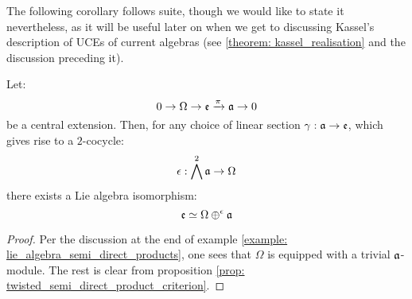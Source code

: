         The following corollary follows suite, though we would like to state it nevertheless, as it will be useful later on when we get to discussing Kassel's description of UCEs of current algebras (see \ref{theorem: kassel_realisation} and the discussion preceding it).
        \begin{corollary} \label{coro: lie_brackets_on_central_extensions}
            Let:
                $$0 \to \Omega \to \mathfrak{e} \xrightarrow[]{\pi} \mathfrak{a} \to 0$$
            be a central extension. Then, for any choice of linear section $\gamma: \mathfrak{a} \to \mathfrak{e}$, which gives rise to a $2$-cocycle:
                $$\epsilon: \bigwedge^2 \mathfrak{a} \to \Omega$$
            there exists a Lie algebra isomorphism:
                $$\mathfrak{e} \simeq \Omega \oplus^{\epsilon} \mathfrak{a}$$
        \end{corollary}
            \begin{proof}
                Per the discussion at the end of example \ref{example: lie_algebra_semi_direct_products}, one sees that $\Omega$ is equipped with a trivial $\mathfrak{a}$-module. The rest is clear from proposition \ref{prop: twisted_semi_direct_product_criterion}.
            \end{proof}

